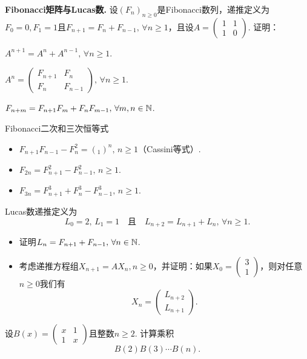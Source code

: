 \begin{mybox}
\begin{problem}{\bfseries Fibonacci矩阵与Lucas数.}
   设$(F_n)_{n\ge0}$是Fibonacci数列，递推定义为$F_0=0,F_1=1$且$F_{n+1}=F_n+F_{n-1},\,\forall n\ge1$，且设$A=\begin{pmatrix}
     1 & 1\\
     1 & 0
   \end{pmatrix}$. 证明：
   \begin{enum}
     \item $A^{n+1}=A^n+A^{n-1},\,\forall n\ge1$.
     \item\label{prob1.29.b} $A^n=\begin{pmatrix}
       F_{n+1} & F_n \\
       F_n & F_{n-1}
     \end{pmatrix},\,\forall n\ge1$.
     \item\label{prob1.29.c} $F_{n+m}=F_{n+1}F_m+F_nF_{m-1},\,\forall m,n\in\mathbb N$.
     \item {\kaishu Fibonacci二次和三次恒等式}
     \begin{itemize}
       \item $F_{n+1}F_{n-1}-F_n^2=(_1)^n,\,n\ge1$（Cassini等式）.
       \item $F_{2n}=F_{n+1}^2-F_{n-1}^2,\,n\ge1$.
       \item $F_{3n}=F_{n+1}^3+F_n^3-F_{n-1}^3,\,n\ge1$.
     \end{itemize}
     \item {\kaishu Lucas数}递推定义为
     \[
       L_0=2,\,L_1=1\quad\text{且}\quad
       L_{n+2} = L_{n+1} + L_n,\,\forall n\ge1.
     \]
     \begin{itemize}
       \item 证明$L_n=F_{n+1}+F_{n-1},\,\forall n\in\mathbb N$.
       \item 考虑递推方程组$X_{n+1}=AX_n,n\ge0$，并证明：如果$X_0=\begin{pmatrix}
             3 \\ 1
           \end{pmatrix}$，则对任意$n\ge0$我们有
           \[
             X_n = \begin{pmatrix}
               L_{n+2} \\ L_{n+1}
             \end{pmatrix}.
           \]
     \end{itemize}
   \end{enum}
  \end{problem}
\end{mybox}

\begin{problem}
  \cite{23} 设$B(x)=\begin{pmatrix}
    x & 1\\
    1 & x
  \end{pmatrix}$且整数$n\ge2$. 计算乘积
  \[
    B(2)B(3)\cdots B(n).
  \]
\end{problem}

